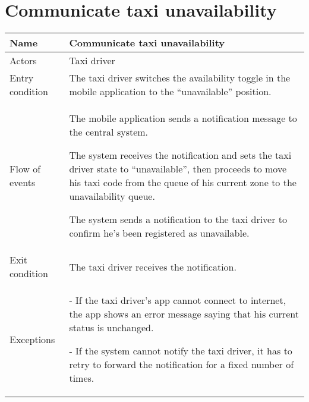 \section{Communicate taxi unavailability}
\begin{center}
\begin{longtable}{|l| p{9cm}|}
\hline
Name &
Communicate taxi unavailability \\
\hline
Actors &
Taxi driver \\
\hline
Entry condition & 
The taxi driver switches the availability toggle in the mobile application to the ``unavailable'' position. \\
\hline
Flow of events & 
The mobile application sends a notification message to the central system. 

The system receives the notification and sets the taxi driver state to ``unavailable'', then proceeds to move his taxi code from the queue of his current zone to the unavailability queue.

The system sends a notification to the taxi driver to confirm he's been registered as unavailable. \\
\hline
Exit condition &
The taxi driver receives the notification. \\
\hline
Exceptions &
- If the taxi driver's app cannot connect to internet, the app shows an error message saying that his current status is unchanged.

- If the system cannot notify the taxi driver, it has to retry to forward the notification for a fixed number of times. \\
\hline
\end{longtable}
\end{center}


